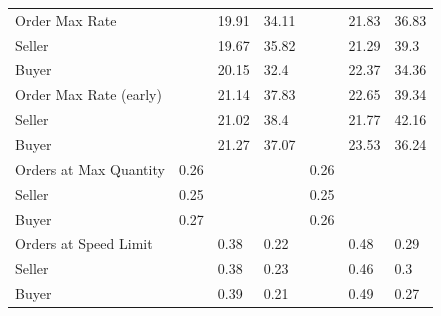 \begin{tabular}{lllllll}
 Order Max Rate           &          & 19.91         & 34.11         &           & 21.83         & 36.83         \\
 Seller                   &          & 19.67         & 35.82         &           & 21.29         & 39.3          \\
 Buyer                    &          & 20.15         & 32.4          &           & 22.37         & 34.36         \\
 Order Max Rate (early)   &          & 21.14         & 37.83         &           & 22.65         & 39.34         \\
 Seller                   &          & 21.02         & 38.4          &           & 21.77         & 42.16         \\
 Buyer                    &          & 21.27         & 37.07         &           & 23.53         & 36.24         \\
 Orders at Max Quantity   & 0.26     &               &               & 0.26      &               &               \\
 Seller                   & 0.25     &               &               & 0.25      &               &               \\
 Buyer                    & 0.27     &               &               & 0.26      &               &               \\
 Orders at Speed Limit    &          & 0.38          & 0.22          &           & 0.48          & 0.29          \\
 Seller                   &          & 0.38          & 0.23          &           & 0.46          & 0.3           \\
 Buyer                    &          & 0.39          & 0.21          &           & 0.49          & 0.27          \\
\hline
\end{tabular}